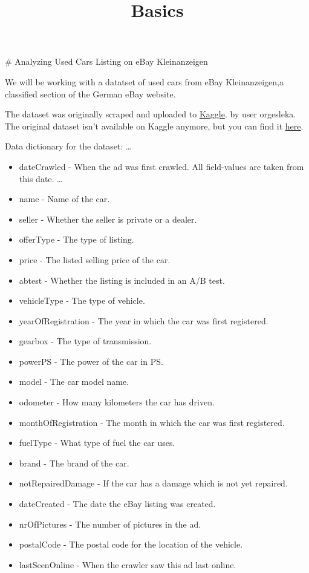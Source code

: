 \documentclass[11pt]{article}
\title{Basics}
\begin{document}
    
    \maketitle
    
    

    
    \# Analyzing Used Cars Listing on eBay Kleinanzeigen

    We will be working with a datatset of used cars from eBay
Kleinanzeigen,a classified section of the German eBay website.

    The dataset was originally scraped and uploaded to
\href{https://www.kaggle.com/orgesleka/used-cars-database/data}{Kaggle}.
by user orgesleka. The original dataset isn't available on Kaggle
anymore, but you can find it
\href{https://data.world/data-society/used-cars-data}{here}.

    Data dictionary for the dataset: \ldots{}

\begin{itemize}
\item
  dateCrawled - When the ad was first crawled. All field-values are
  taken from this date. \ldots{}
\item
  name - Name of the car.
\item
  seller - Whether the seller is private or a dealer.
\item
  offerType - The type of listing.
\item
  price - The listed selling price of the car.
\item
  abtest - Whether the listing is included in an A/B test.
\item
  vehicleType - The type of vehicle.
\item
  yearOfRegistration - The year in which the car was first registered.
\item
  gearbox - The type of transmission.
\item
  powerPS - The power of the car in PS.
\item
  model - The car model name.
\item
  odometer - How many kilometers the car has driven.
\item
  monthOfRegistration - The month in which the car was first registered.
\item
  fuelType - What type of fuel the car uses.
\item
  brand - The brand of the car.
\item
  notRepairedDamage - If the car has a damage which is not yet repaired.
\item
  dateCreated - The date the eBay listing was created.
\item
  nrOfPictures - The number of pictures in the ad.
\item
  postalCode - The postal code for the location of the vehicle.
\item
  lastSeenOnline - When the crawler saw this ad last online.
\end{itemize}
\end{document}
